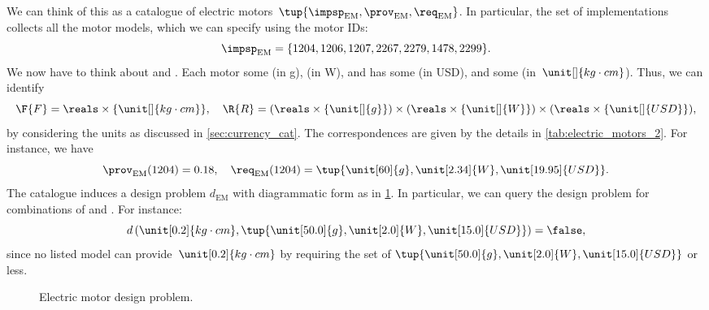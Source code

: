 \begin{example}
    We can think of this as a catalogue of electric motors~$\tup{\impsp_\mathrm{EM},\prov_\mathrm{EM},\req_\mathrm{EM}}$. In particular, the set of implementations collects all the motor models, which we can specify using the motor IDs:
    \begin{equation}
        \impsp_\mathrm{EM}=\{1204,1206,1207,2267,2279,1478,2299 \}.
    \end{equation}
    We now have to think about  and . Each motor  some  (in \unit[]{g}),  (in \unit[]{W}), and has some  (in USD), and  some  (in~$\unit[]{kg\cdot cm}$). Thus, we can identify
    \begin{equation*}
        \F{F}=\reals\times \{\unit[]{kg\cdot cm}\},\quad \R{R}=(\reals\times \{\unit[]{g}\})\times (\reals\times \{\unit[]{W}\})\times (\reals\times \{\unit[]{USD}\}),
    \end{equation*}
    by considering the units as discussed in \cref{sec:currency_cat}. The correspondences are given by the details in \cref{tab:electric_motors_2}. For instance, we have
    \begin{equation}
        \prov_\mathrm{EM}(1204)=0.18, \quad \req_\mathrm{EM}(1204)=\tup{\unit[60]{g},\unit[2.34]{W},\unit[19.95]{USD}}.
    \end{equation}
    The catalogue induces a design problem $d_\mathrm{EM}$ with diagrammatic form as in \cref{fig:dp_em}. In particular, we can query the design problem for combinations of  and . For instance:
    \begin{equation}
        d\left(\unit[0.2]{kg\cdot cm}, \tup{\unit[50.0]{g},\unit[2.0]{W},\unit[15.0]{USD}} \right)=\false,
    \end{equation}
    since no listed model can provide~$\unit[0.2]{kg\cdot cm}$  by requiring the set of  $\tup{\unit[50.0]{g},\unit[2.0]{W},\unit[15.0]{USD}}$ or less.

    \begin{figure}[tbh]
        \begin{center}
        \end{center}
        \caption{Electric motor design problem.}\label{fig:dp_em}
    \end{figure}


\end{example}
